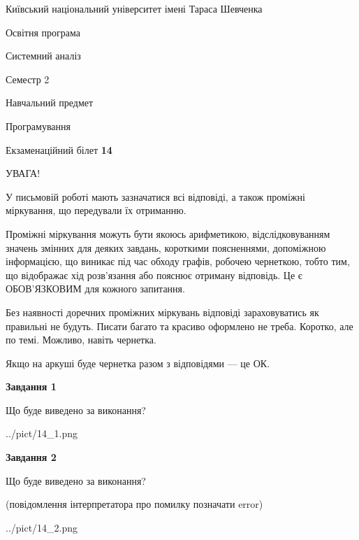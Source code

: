 \documentclass[12pt, ukrainian]{article}
\begin{document}
{{\begin {small}\par
{ \center  Київський національний університет імені Тараса Шевченка \par}
{\parbox {5 cm}{Освітня програма \hfill}{\parbox {7 cm}{Системний аналіз \hfill}}\parbox {6 cm}{\hfill Семестр 2}}\par
{\parbox {5 cm} {Навчальний предмет \hfill}\parbox {7 cm}{Програмування \hfill}\parbox {6cm}{\hfill}\par}\vspace{-7pt} \end{small}}{\center Екзаменаційний білет \No \textbf
{ 14 }\par}}
{
\begin {large}
УВАГА!

У письмовій роботі мають зазначатися всі відповіді, а також проміжні міркування, що передували їх отриманню.

Проміжні міркування можуть бути якоюсь арифметикою, відслідковуванням зна\-чень змінних для деяких завдань,
короткими поясненнями, допоміжною інформацією, що виникає під час обходу графів, робочею чернеткою,
тобто тим, що відображає хід розв’язання або пояснює отриману відповідь.
Це є ОБОВ’ЯЗКОВИМ для кожного запитання.

Без наявності доречних проміжних міркувань відповіді зараховуватись як правиль\-ні не будуть.
Писати багато та красиво оформлено не треба. Коротко, але по темі. Можли\-во, навіть чернетка.

Якщо на аркуші буде чернетка разом з відповідями --- це ОК.

\newpage

{\begin {center}\textbf{Завдання 1}\end {center}}\par
Що буде виведено за виконання?\par
\begin{center}
	{../pict/14_1.png}
\end{center}
\newpage

{\begin {center}\textbf{Завдання 2}\end {center}}\par
Що буде виведено за виконання?\par
 (повідомлення інтерпретатора про помилку позначати error)\par
\begin{center}
	{../pict/14_2.png}
\end{center}
\newpage


\end{large}}
\end{document}
